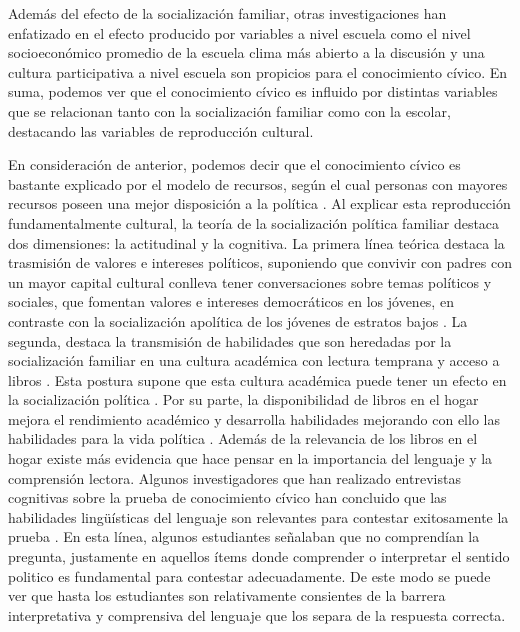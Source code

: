 \documentclass[12pt,twoside]{templates/facsothesis}
\begin{document}
Además del efecto de la socialización familiar, otras investigaciones han enfatizado en el efecto producido por variables a nivel escuela como el nivel socioeconómico promedio de la escuela clima más abierto a la discusión y una cultura participativa a nivel escuela son propicios para el conocimiento cívico. En suma, podemos ver que el conocimiento cívico es influido por distintas variables que se relacionan tanto con la socialización familiar como con la escolar, destacando las variables de reproducción cultural.

En consideración de anterior, podemos decir que el conocimiento cívico es bastante explicado por el modelo de recursos, según el cual personas con mayores recursos poseen una mejor disposición a la política \citep{miranda_Desigualdad_2015}. Al explicar esta reproducción fundamentalmente cultural, la teoría de la socialización política familiar destaca dos dimensiones: la actitudinal y la cognitiva. La primera línea teórica destaca la trasmisión de valores e intereses políticos, suponiendo que convivir con padres con un mayor capital cultural conlleva tener conversaciones sobre temas políticos y sociales, que fomentan valores e intereses democráticos en los jóvenes, en contraste con la socialización apolítica de los jóvenes de estratos bajos \citep{gimpel_Cultivating_2003, wasburn_Making_2017}. La segunda, destaca la transmisión de habilidades que son heredadas por la socialización familiar en una cultura académica con lectura temprana y acceso a libros \citep{evans_Scholarly_2015, park_Home_2008}. Esta postura supone que esta cultura académica puede tener un efecto en la socialización política \citep{duarte_influence_2017, boeve-depauw_crossnational_2010}. Por su parte, la disponibilidad de libros en el hogar mejora el rendimiento académico y desarrolla habilidades mejorando con ello las habilidades para la vida política \citep{evans_Scholarly_2015}.
Además de la relevancia de los libros en el hogar existe más evidencia que hace pensar en la importancia del lenguaje y la comprensión lectora. Algunos investigadores que han realizado entrevistas cognitivas sobre la prueba de conocimiento cívico han concluido que las habilidades lingüísticas del lenguaje son relevantes para contestar exitosamente la prueba \citep{zhang_Understanding_2015, arensmeier_Swedish_2015}. En esta línea, algunos estudiantes señalaban que no comprendían la pregunta, justamente en aquellos ítems donde comprender o interpretar el sentido politico es fundamental para contestar adecuadamente. De este modo se puede ver que hasta los estudiantes son relativamente consientes de la barrera interpretativa y comprensiva del lenguaje que los separa de la respuesta correcta.\\
\end{document}
